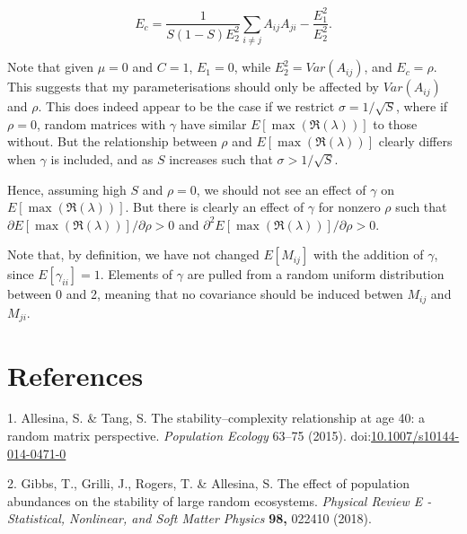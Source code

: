 \documentclass[]{article}
\begin{document}
\[E_{c} = \frac{1}{S(1-S)E^{2}_{2}}\sum_{i \neq j} A_{ij} A_{ji} - \frac{E^{2}_{1}}{E^{2}_{2}}.\]

Note that given \(\mu = 0\) and \(C = 1\), \(E_{1} = 0\), while
\(E^{2}_{2} = Var(A_{ij})\), and \(E_{c} = \rho\). This suggests that my
parameterisations should only be affected by \(Var(A_{ij})\) and
\(\rho\). This does indeed appear to be the case if we restrict
\(\sigma = 1/\sqrt{S}\), where if \(\rho = 0\), random matrices with
\(\gamma\) have similar \(E[\max(\Re(\lambda))]\) to those without. But
the relationship between \(\rho\) and \(E[\max(\Re(\lambda))]\) clearly
differs when \(\gamma\) is included, and as \(S\) increases such that
\(\sigma > 1/\sqrt{S}\).

Hence, assuming high \(S\) and \(\rho = 0\), we should not see an effect
of \(\gamma\) on \(E[\max(\Re(\lambda))]\). But there is clearly an
effect of \(\gamma\) for nonzero \(\rho\) such that
\(\partial E[\max(\Re(\lambda))] / \partial\rho > 0\) and
\(\partial^{2} E[\max(\Re(\lambda))] / \partial\rho > 0\).

Note that, by definition, we have not changed \(E[M_{ij}]\) with the
addition of \(\gamma\), since \(E[\gamma_{ii}] = 1\). Elements of
\(\gamma\) are pulled from a random uniform distribution between 0 and
2, meaning that no covariance should be induced betwen \(M_{ij}\) and
\(M_{ji}\).

\section*{References}\label{references}

\hypertarget{refs}{}
\hypertarget{ref-Allesina2015a}{}
1. Allesina, S. \& Tang, S. The stability--complexity relationship at
age 40: a random matrix perspective. \emph{Population Ecology} 63--75
(2015).
doi:\href{https://doi.org/10.1007/s10144-014-0471-0}{10.1007/s10144-014-0471-0}

\hypertarget{ref-Gibbs2017}{}
2. Gibbs, T., Grilli, J., Rogers, T. \& Allesina, S. The effect of
population abundances on the stability of large random ecosystems.
\emph{Physical Review E - Statistical, Nonlinear, and Soft Matter
Physics} \textbf{98,} 022410 (2018).
\end{document}
